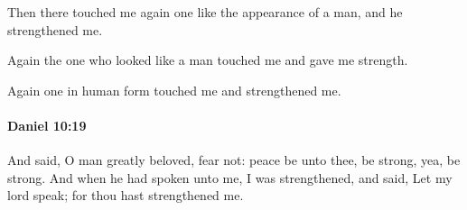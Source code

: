 			\begin{versebox}
					\item[BHS] 
					\item[LXX] 
					\item[ASV] Then there touched me again one like the appearance of a man, and he strengthened me.
					\item[NIV] Again the one who looked like a man touched me and gave me strength.
					\item[NRSV] Again one in human form touched me and strengthened me.
			\end{versebox}

		\paragraph{Daniel 10:19} %
			\label{DANIEL-10-19}

			And said, O man greatly beloved, fear not: peace be unto thee, be strong, yea, be strong. And when he had spoken unto me, I was strengthened, and said, Let my lord speak; for thou hast strengthened me.

